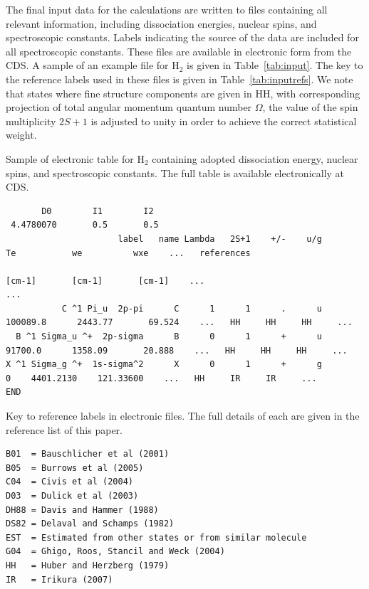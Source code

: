 \documentclass[traditabstract]{aa} %
\begin{document}
The final input data for the calculations are written to files containing all relevant information, including dissociation energies, nuclear spins, and spectroscopic constants.  Labels indicating the source of the data are included for all spectroscopic constants.  These files are available in electronic form from the CDS.  A sample of an example file for H$_2$ is given in Table~\ref{tab:input}.  The key to the reference labels used in these files is given in Table~\ref{tab:inputrefs}.  We note that states where fine structure components are given in HH, with corresponding projection of total angular momentum quantum number $\Omega$, the value of the spin multiplicity $2S+1$ is adjusted to unity in order to achieve the correct statistical weight. 


\begin{table}
\begin{center}
\caption{Sample of electronic table for H$_2$ containing adopted dissociation energy, nuclear spins, and spectroscopic constants. The full table is available electronically at CDS.}
\label{tab:input}
\scriptsize
\begin{verbatim} 
       D0        I1        I2
 4.4780070       0.5       0.5
                      label   name Lambda   2S+1    +/-    u/g           Te           we          wxe    ...   references 
                                                                     [cm-1]       [cm-1]       [cm-1]    ...                 
...
           C ^1 Pi_u  2p-pi      C      1      1      .      u     100089.8      2443.77       69.524    ...   HH     HH     HH     ...
  B ^1 Sigma_u ^+  2p-sigma      B      0      1      +      u      91700.0      1358.09       20.888    ...   HH     HH     HH     ...
X ^1 Sigma_g ^+  1s-sigma^2      X      0      1      +      g            0    4401.2130    121.33600    ...   HH     IR     IR     ...
END
\end{verbatim}
\end{center}
\end{table} 

\begin{table}
\begin{center}
\caption{Key to reference labels in electronic files.  The full details of each are given in the reference list of this paper.}
\label{tab:inputrefs}
\scriptsize
\begin{verbatim} 
B01  = Bauschlicher et al (2001)
B05  = Burrows et al (2005)
C04  = Civis et al (2004)
D03  = Dulick et al (2003)
DH88 = Davis and Hammer (1988)
DS82 = Delaval and Schamps (1982)
EST  = Estimated from other states or from similar molecule
G04  = Ghigo, Roos, Stancil and Weck (2004) 
HH   = Huber and Herzberg (1979)
IR   = Irikura (2007)
\end{verbatim}
\end{center}
\end{table} 
\end{document}
